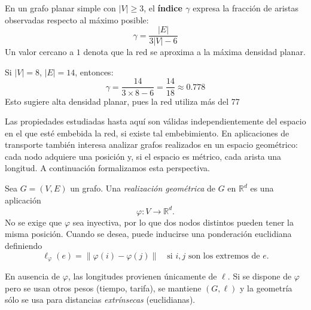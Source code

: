             \begin{definicion}
                En un grafo planar simple con $|V|\ge 3$, el \textbf{índice $\gamma$} expresa la fracción de aristas observadas respecto al máximo posible:
                \[
                \gamma = \frac{|E|}{3|V| - 6}
                \]
                Un valor cercano a $1$ denota que la red se aproxima a la máxima densidad planar.
            \end{definicion}

            \begin{ejemplo}
                Si $|V| = 8$, $|E| = 14$, entonces:
                \[
                \gamma = \frac{14}{3 \times 8 - 6} = \frac{14}{18} \approx 0.778
                \]
                Esto sugiere alta densidad planar, pues la red utiliza más del 77%
            \end{ejemplo}

        Las propiedades estudiadas hasta aquí son válidas independientemente del espacio en el que esté embebida la red, si existe tal embebimiento. En aplicaciones de transporte también interesa analizar grafos realizados en un espacio geométrico: cada nodo adquiere una posición y, si el espacio es métrico, cada arista una longitud. A continuación formalizamos esta perspectiva.

        \begin{definicion}
            Sea $G=(V,E)$ un grafo. Una \emph{realización geométrica} de $G$ en $\mathbb{R}^d$ es una aplicación
            \[
                \varphi:V\to \mathbb{R}^d.
            \]
            No se exige que $\varphi$ sea inyectiva, por lo que dos nodos distintos pueden tener la misma posición.
            Cuando se desea, puede inducirse una ponderación euclidiana definiendo
            \[
            \ell_\varphi(e)=\|\varphi(i)-\varphi(j)\| \quad \text{si } i,j \text{ son los extremos de } e.
            \]
        \end{definicion}

        \begin{observacion}
            En ausencia de $\varphi$, las longitudes provienen únicamente de $\ell$. Si se dispone de $\varphi$ pero se usan otros pesos (tiempo, tarifa), se mantiene $(G,\ell)$ y la geometría sólo se usa para distancias \emph{extrínsecas} (euclidianas).
        \end{observacion}

